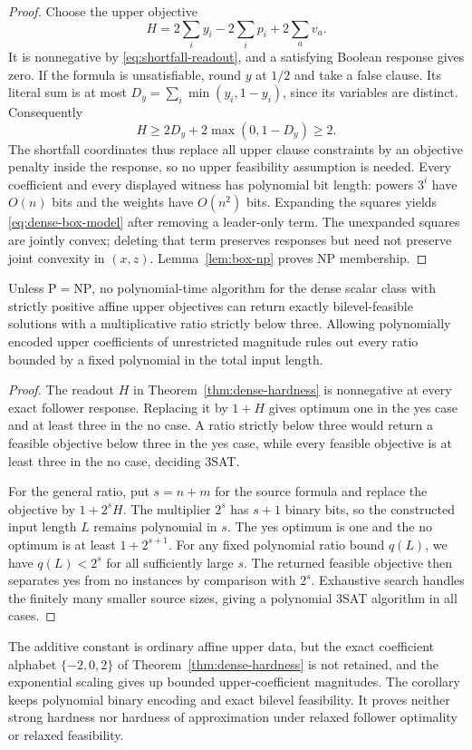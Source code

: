 \begin{proof}
Choose the upper objective
\[
 H=2\sum_i y_i-2\sum_i p_i+2\sum_a v_a.
\]
It is nonnegative by \eqref{eq:shortfall-readout}, and a satisfying Boolean
response gives zero. If the formula is unsatisfiable, round \(y\) at \(1/2\)
and take a false clause. Its literal sum is at most
\(D_y=\sum_i\min(y_i,1-y_i)\), since its variables are distinct. Consequently
\[
 H\ge 2D_y+2\max(0,1-D_y)\ge2.
\]
The shortfall coordinates thus replace all upper clause constraints by an
objective penalty inside the response, so no upper feasibility assumption is
needed. Every coefficient and every displayed witness has polynomial bit
length: powers \(3^i\) have \(O(n)\) bits and the weights have \(O(n^2)\) bits.
Expanding the squares yields \eqref{eq:dense-box-model} after removing a
leader-only term. The unexpanded squares are jointly convex; deleting that
term preserves responses but need not preserve joint convexity in \((x,z)\).
Lemma~\ref{lem:box-np} proves NP membership.
\end{proof}

\begin{corollary}
\label{cor:dense-multiplicative}
Unless \(\mathrm P=\mathrm{NP}\), no polynomial-time algorithm for the
dense scalar class with strictly positive affine upper objectives can return
exactly bilevel-feasible solutions with a multiplicative ratio strictly below
three. Allowing polynomially encoded upper coefficients of unrestricted
magnitude rules out every ratio bounded by a fixed polynomial in the total
input length.
\end{corollary}
\begin{proof}
The readout \(H\) in Theorem~\ref{thm:dense-hardness} is nonnegative at every
exact follower response. Replacing it by \(1+H\) gives optimum one in the
yes case and at least three in the no case. A ratio strictly below three
would return a feasible objective below three in the yes case, while every
feasible objective is at least three in the no case, deciding 3SAT.

For the general ratio, put \(s=n+m\) for the source formula and replace
the objective by \(1+2^sH\). The multiplier \(2^s\) has \(s+1\) binary
bits, so the constructed input length \(L\) remains polynomial in \(s\).
The yes optimum is one and the no optimum is at least \(1+2^{s+1}\).
For any fixed polynomial ratio bound \(q(L)\), we have \(q(L)<2^s\)
for all sufficiently large \(s\). The returned feasible objective then
separates yes from no instances by comparison with \(2^s\). Exhaustive
search handles the finitely many smaller source sizes, giving a polynomial
3SAT algorithm in all cases.
\end{proof}
The additive constant is ordinary affine upper data, but the exact coefficient
alphabet $\{-2,0,2\}$ of Theorem~\ref{thm:dense-hardness} is not retained, and the
exponential scaling gives up bounded upper-coefficient magnitudes. The
corollary keeps polynomial binary encoding and exact bilevel feasibility. It
proves neither strong hardness nor hardness of approximation under relaxed
follower optimality or relaxed feasibility.

